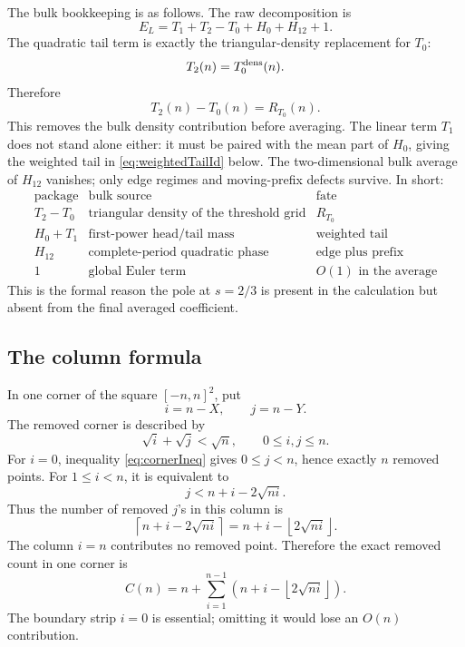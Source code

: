 \documentclass[a4paper,american,11pt]{amsart}
\theoremstyle{plain}
\theoremstyle{definition}
\newcommand{\floor}[1]{\left\lfloor #1\right\rfloor}
\begin{document}
The bulk bookkeeping is as follows.  The raw decomposition is
\[
 E_L=T_1+T_2-T_0+H_0+H_{12}+1.
\]
The quadratic tail term is exactly the triangular-density replacement for
\(T_0\):
\[
 T_2(n)=T^{\rm dens}_0(n).
\]
Therefore
\[
 T_2(n)-T_0(n)=R_{T_0}(n).
\]
This removes the bulk density contribution before averaging.  The linear term
\(T_1\) does not stand alone either: it must be paired with the mean part of
\(H_0\), giving the weighted tail in \eqref{eq:weightedTailId} below.  The
two-dimensional bulk average of \(H_{12}\) vanishes; only edge regimes and
moving-prefix defects survive.  In short:
\[
\begin{array}{c|c|c}
\text{package} & \text{bulk source} & \text{fate}\\ \hline
T_2-T_0 & \text{triangular density of the threshold grid} & R_{T_0}\\
H_0+T_1 & \text{first-power head/tail mass} & \text{weighted tail}\\
H_{12} & \text{complete-period quadratic phase} & \text{edge plus prefix}\\
1 & \text{global Euler term} & O(1)\text{ in the average}
\end{array}
\]
This is the formal reason the pole at \(s=2/3\) is present in the calculation
but absent from the final averaged coefficient.

\subsection{The column formula}

In one corner of the square \([-n,n]^2\), put
\[
 i=n-X,
 \qquad
 j=n-Y.
\]
The removed corner is described by
\begin{equation}\label{eq:cornerIneq}
 \sqrt i+\sqrt j<\sqrt n,
 \qquad 0\le i,j\le n.
\end{equation}
For \(i=0\), inequality \eqref{eq:cornerIneq} gives \(0\le j<n\), hence
exactly \(n\) removed points.  For \(1\le i<n\), it is equivalent to
\[
 j<n+i-2\sqrt{ni}.
\]
Thus the number of removed \(j\)'s in this column is
\[
 \left\lceil n+i-2\sqrt{ni}\right\rceil=n+i-\floor{2\sqrt{ni}}.
\]
The column \(i=n\) contributes no removed point.  Therefore the exact removed
count in one corner is
\begin{equation}\label{eq:cornerCount}
 C(n)=n+\sum_{i=1}^{n-1}\left(n+i-\floor{2\sqrt{ni}}\right).
\end{equation}
The boundary strip \(i=0\) is essential; omitting it would lose an \(O(n)\)
contribution.
\end{document}
